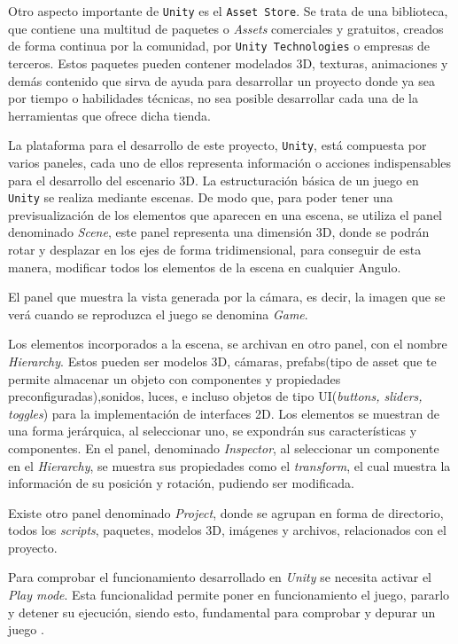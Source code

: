 Otro aspecto importante de \texttt{Unity} es el \texttt{Asset Store}. Se trata de una biblioteca, que contiene una multitud de paquetes o \textit{Assets} comerciales y gratuitos, creados de forma continua por la comunidad, por \texttt{Unity Technologies} o empresas de terceros. Estos paquetes pueden contener modelados 3D, texturas, animaciones y demás contenido que sirva de ayuda para desarrollar un proyecto donde ya sea por tiempo o habilidades técnicas, no sea posible desarrollar cada una de la herramientas que ofrece dicha tienda.

La plataforma para el desarrollo de este proyecto, \texttt{Unity},  está compuesta por varios paneles, cada uno de ellos representa información o acciones indispensables para el desarrollo del escenario 3D. La estructuración básica de un juego en \texttt{Unity} se realiza mediante escenas.  De modo que, para poder tener una previsualización de los elementos que aparecen en una escena, se utiliza el panel denominado \textit{Scene}, este panel representa una dimensión 3D, donde se podrán rotar y desplazar en los ejes de forma tridimensional, para conseguir de esta manera, modificar todos los elementos de la escena en cualquier Angulo.

El panel que muestra la vista generada por la cámara, es decir, la imagen que se verá cuando se reproduzca el juego se denomina \textit{Game}.

Los elementos incorporados a la escena, se archivan en otro panel, con el nombre \textit{Hierarchy}. Estos pueden ser modelos 3D, cámaras, prefabs(tipo de asset que te permite almacenar un objeto con componentes y propiedades preconfiguradas),sonidos, luces, e incluso objetos de tipo UI(\textit{buttons, sliders, toggles}) para la implementación de interfaces 2D. Los elementos se muestran de una forma jerárquica, al seleccionar uno, se expondrán sus características y componentes. En el panel, denominado \textit{Inspector}, al seleccionar un componente en el \textit{Hierarchy}, se muestra sus propiedades como el \textit{transform}, el cual muestra la información de su posición y rotación, pudiendo ser modificada.

Existe otro panel denominado \textit{Project}, donde se agrupan en forma de directorio, todos los \textit{scripts}, paquetes, modelos 3D, imágenes y archivos, relacionados con el proyecto.

\vspace{0.7cm}

Para comprobar el funcionamiento desarrollado en \textit{Unity} se necesita activar el \textit{Play mode}. Esta funcionalidad permite poner en funcionamiento el juego, pararlo y detener su ejecución, siendo esto, fundamental para comprobar y depurar un juego \cite{Unity_Manual}.

